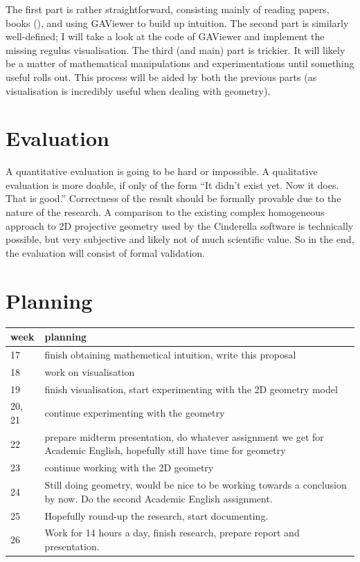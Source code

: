 \documentclass[a4paper, 10pt]{article}
\begin{document}
The first part is rather straightforward, consisting mainly of reading papers,
books (\cite{dorst2009geometric}), and using GAViewer to build up intuition.
The second part is similarly well-defined; I will take a look at the code of
GAViewer and implement the missing regulus visualisation. The third (and main)
part is trickier. It will likely be a matter of mathematical manipulations and
experimentations until something useful rolls out. This process will be aided by
both the previous parts (as visualisation is incredibly useful when dealing with
geometry).

\section{Evaluation}
A quantitative evaluation is going to be hard or impossible. A qualitative
evaluation is more doable, if only of the form ``It didn't exist yet. Now it
does. That is good.'' Correctness of the result should be formally
provable due to the nature of the research. A comparison to the
existing complex homogeneous approach to 2D projective geometry used
by the Cinderella software is technically possible, but very
subjective and likely not of much scientific value. So in the end, the
evaluation will consist of formal validation.

\section{Planning}
\begin{table}[h!]
  \centering
  \begin{tabular}{| l | p{9cm} |}
    \hline
    week & planning \\
    \hline
    \hline
    17     & finish obtaining mathemetical intuition, write this proposal                                    \\
    \hline
    18     & work on visualisation                                                \\
    \hline
    19     & finish visualisation, start experimenting with the 2D geometry model \\
    \hline
    20, 21 & continue experimenting with the geometry                             \\
    \hline
    22     & prepare midterm presentation, do whatever assignment we get for Academic English, hopefully still have time for geometry                      \\
    \hline
    23     & continue working with the 2D geometry                                \\
    \hline
    24     & Still doing geometry, would be nice to be working towards a conclusion by now. Do the second Academic English assignment.                 \\
    \hline
    25     & Hopefully round-up the research, start documenting.                  \\
    \hline
    26     & Work for 14 hours a day, finish research, prepare report and presentation.   \\
    \hline
  \end{tabular}
\end{table}



\end{document}

